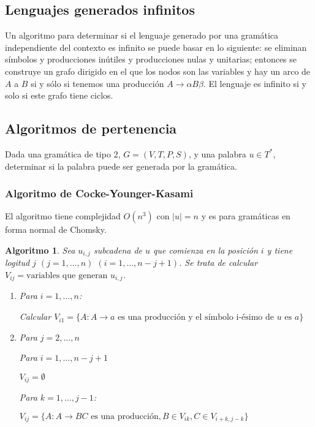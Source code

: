 \documentclass[11pt,titlepage,a4paper]{article}
\theoremstyle{ejemplo}
\theoremstyle{algoritmo}
\newtheorem*{alg}{Algoritmo} %
\begin{document}
\subsection{Lenguajes generados infinitos}

Un algoritmo para determinar si el lenguaje generado por una gramática 
independiente del contexto es infinito se puede basar en lo siguiente: se
eliminan símbolos y producciones inútiles y producciones nulas y unitarias;
entonces se construye un grafo dirigido en el que los nodos son las variables y 
hay un arco de $A$ a $B$ si y sólo si tenemos una producción $A\to\alpha B\beta$.
El lenguaje es infinito si y solo si este grafo tiene ciclos.

\subsection{Algoritmos de pertenencia}

Dada una gramática de tipo 2, $G=(V,T,P,S)$, y una palabra $u\in T^*$,
determinar si la palabra puede ser generada por la gramática.

\subsubsection{Algoritmo de Cocke-Younger-Kasami}

El algoritmo tiene complejidad $O(n^3)$ con $|u|=n$ y es para gramáticas en
forma normal de Chomsky.

\begin{alg}
Sea $u_{i,j}$ subcadena de $u$ que comienza en la posición $i$ y tiene logitud 
$j$ $(j=1,\dots,n)$ $(i=1,\dots,n-j+1)$. Se trata de calcular $V_{ij}=\text{variables que generan }u_{i,j}$.
\begin{enumerate}[noitemsep]
	\item Para $i=1,\dots,n$:
	
	\quad\quad Calcular $V_{i1}=\{A:A\to a\text{ es una producción y el símbolo
	i-ésimo de }u\text{ es }a\}$
	\item Para $j=2,\dots,n$
	
	\quad\quad Para $i=1,\dots,n-j+1$
	
	\quad\quad\quad\quad $V_{ij}=\emptyset$
	
	\quad\quad\quad\quad Para $k=1,\dots,j-1$:
	
	\quad\quad\quad\quad\quad\quad
	$V_{ij}=\{A:A\to BC\text{ es una producción},B\in V_{ik},C\in V_{i+k,j-k}\}$
\end{enumerate}
\end{alg} 
\end{document}
